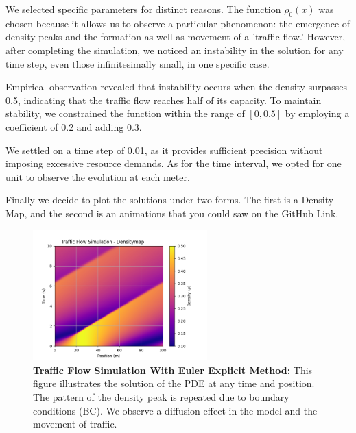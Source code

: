 \documentclass{article}
\begin{document}
	We selected specific parameters for distinct reasons. The function $\rho_0(x)$ was chosen because it allows us to observe a particular phenomenon: the emergence of density peaks and the formation as well as movement of a 'traffic flow.' However, after completing the simulation, we noticed an instability in the solution for any time step, even those infinitesimally small, in one specific case.
	
	Empirical observation revealed that instability occurs when the density surpasses 0.5, indicating that the traffic flow reaches half of its capacity. To maintain stability, we constrained the function within the range of $[0, 0.5]$ by employing a coefficient of 0.2 and adding 0.3.
	
	We settled on a time step of 0.01, as it provides sufficient precision without imposing excessive resource demands. As for the time interval, we opted for one unit to observe the evolution at each meter.
	
	Finally we decide to plot the solutions under two forms. The first is a Density Map, and the second is an animations that you could saw on the GitHub Link.
	
	\begin{figure}[H]
		\centering
		\includegraphics[width=0.60\textwidth]{traffic_flow_density_map.png}
		\caption[Traffic Flow Simulation With Euler Explicit]{\textbf{\underline{Traffic Flow Simulation With Euler Explicit Method:}} This figure illustrates the solution of the PDE at any time and position. The pattern of the density peak is repeated due to boundary conditions (BC). We observe a diffusion effect in the model and the movement of traffic. }
		\label{fig:traffic_flow_density_map}
	\end{figure}
	
\end{document}
